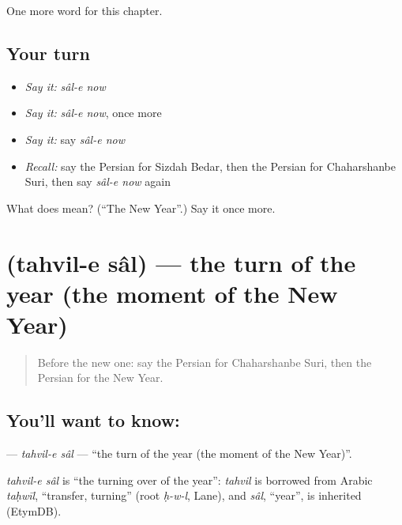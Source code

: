 \begin{grammarlens}[title={What you've built}]
One more word for this chapter.
\end{grammarlens}

\subsection*{Your turn}
\begin{itemize}
\raggedright
  \item \emph{Say it:} \emph{sâl-e now}
  \item \emph{Say it:} \emph{sâl-e now}, once more
  \item \emph{Say it:} say \emph{sâl-e now}
  \item \emph{Recall:} say the Persian for Sizdah Bedar, then the Persian for Chaharshanbe Suri, then say \emph{sâl-e now} again
\end{itemize}

\begin{tcolorbox}[breakable,colback=teal!4,colframe=teal!35!black,title={Before you move on}]
What does   mean? (\textquotedblleft{}The New Year\textquotedblright{}.) Say it once more.
\end{tcolorbox}
\section[\texorpdfstring{\fa{تحویل} \fa{سال} (tahvil-e sâl)}{تحویل سال (tahvil-e sâl)}]{  (tahvil-e sâl) — the turn of the year (the moment of the New Year)}

\label{lesson:FA-C228-tahvil-e-sal}



\begin{quote}
Before the new one: say the Persian for Chaharshanbe Suri, then the Persian for the New Year.
\end{quote}

\subsection*{You'll want to know:  }
\textbf{ } — \emph{tahvil-e sâl} — \textquotedblleft{}the turn of the year (the moment of the New Year)\textquotedblright{}.

\begin{cousinweb}
\emph{tahvil-e sâl} is \textquotedblleft{}the turning over of the year\textquotedblright{}: \emph{tahvil} is borrowed from Arabic \emph{taḥwīl}, \textquotedblleft{}transfer, turning\textquotedblright{} (root \emph{ḥ-w-l}, Lane), and \emph{sâl}, \textquotedblleft{}year\textquotedblright{}, is inherited (EtymDB).
\end{cousinweb}

